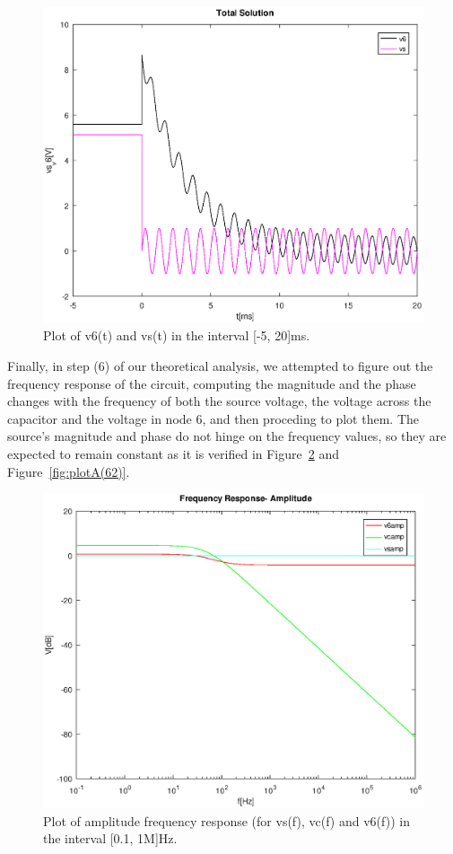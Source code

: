 \begin{figure}[h] \centering
\includegraphics[width=0.8\linewidth]{TotalSolution.eps}
\caption{Plot of v6(t) and vs(t) in the interval [-5, 20]ms.}
\label{fig:plotA(5)}
\end{figure}

Finally, in step (6) of our theoretical analysis, we attempted to figure out the frequency response of the circuit, computing the magnitude and the phase changes with the frequency of both the source voltage, the voltage across the capacitor and the voltage in node 6, and then proceding to plot them.
The source's magnitude and phase do not hinge on the frequency values, so they are expected to remain constant as it is verified in Figure~\ref{fig:plotA(61)} and Figure~\ref{fig:plotA(62)}.

\begin{figure}[h] \centering
\includegraphics[width=0.8\linewidth]{FrequencyResponseAmplitude.eps}
\caption{Plot of amplitude frequency response (for vs(f), vc(f) and v6(f)) in the interval [0.1, 1M]Hz.}
\label{fig:plotA(61)}
\end{figure}

